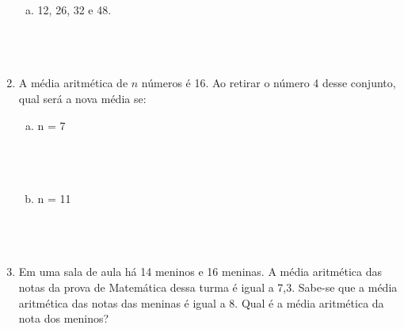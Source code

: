 \documentclass[a4paper,14pt]{article}
\begin{document}
\begin{multicols}{2}
\begin{enumerate}
\begin{enumerate}[a)]
				\item 12, 26, 32 e 48. \\\\\\\\
			\end{enumerate}
			\item A média aritmética de $n$ números é 16. Ao retirar o número 4 desse conjunto, qual será a nova média se:
			\begin{enumerate}[a)]
				\item n = 7 \\\\\\\\
				\item n = 11 \\\\\\\\
			\end{enumerate}
		    \item Em uma sala de aula há 14 meninos e 16 meninas. A média aritmética das notas da prova de Matemática dessa turma é igual a 7,3. Sabe-se que a média aritmética das notas das meninas é igual a 8. Qual é a média aritmética da nota dos meninos?
    	\end{enumerate}
    \end{multicols}
\end{document}
